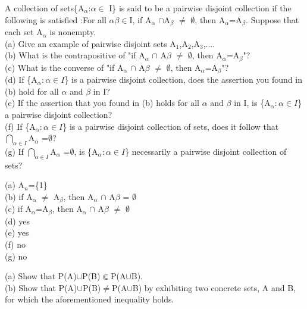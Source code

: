 \documentclass[11pt, a4paper, UTF8]{ctexart}
\begin{document}
\begin{problem}[UD:8.11]
A collection of sets\{A$_\alpha$:$\alpha \in$ I\} is said to be a pairwise disjoint collection if the following is satisfied :For all $\alpha \beta \in$I, if A$_\alpha$ $\cap$A$_\beta$ $\not=$ $\emptyset$, then A$_\alpha$=A$_\beta$. Suppose that each set A$_\alpha$ is nonempty.\\
(a) Give an example of pairwise disjoint sets A$_1$,A$_2$,A$_3$,....\\
(b) What is the contrapositive of "if A$_\alpha$ $\cap$ A$\beta$ $\not=$ $\emptyset$, then A$_\alpha$=A$_\beta$"?\\
(c) What is the converse of "if A$_\alpha$ $\cap$ A$\beta$ $\not=$ $\emptyset$, then A$_\alpha$=A$_\beta$"?\\
(d) If \{A$_\alpha:\alpha \in I$\} is a pairwise disjoint collection, does the assertion you found in (b) hold for all $\alpha$ and $\beta$ in I?\\
(e) If the assertion that you found in (b) holds for all $\alpha$ and $\beta$ in I, is \{A$_\alpha:\alpha \in I$\} a pairwise disjoint collection?\\
(f) If \{A$_\alpha:\alpha \in I$\} is a pairwise disjoint collection of sets, does it follow that $\bigcap_{\alpha \in I}$A$_\alpha$ =$\emptyset$?\\
(g) If $\bigcap_{\alpha \in I}$A$_\alpha$ =$\emptyset$, is \{A$_\alpha:\alpha \in I$\} necessarily a pairwise disjoint collection of sets?
\end{problem}


\begin{solution}
(a) A$_n$=\{1\}\\
(b) if A$_\alpha$ $\not=$ A$_\beta$, then A$_\alpha$ $\cap$ A$\beta$ = $\emptyset$\\
(c) if A$_\alpha$=A$_\beta$, then A$_\alpha$ $\cap$ A$\beta$ $\not=$ $\emptyset$\\
(d) yes\\
(e) yes\\
(f) no\\
(g) no\\

\end{solution}




\begin{problem}[UD:9.2]
(a) Show that P(A)$\cup$P(B)$\Subset$P(A$\cup$B).\\
(b) Show that P(A)$\cup$P(B)$\not=$P(A$\cup$B) by exhibiting two concrete sets, A and B, for which the aforementioned inequality holds.\\
\end{problem}
\end{document}
